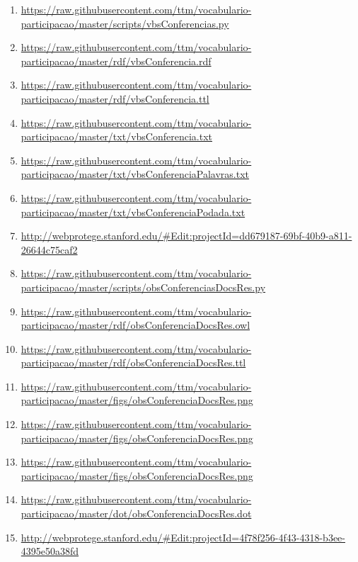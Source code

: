 \documentclass[12pt]{article}
\begin{document}
{\begin{enumerate}
    \item \url{https://raw.githubusercontent.com/ttm/vocabulario-participacao/master/scripts/vbsConferencias.py}\label{i:12}
    \item \url{https://raw.githubusercontent.com/ttm/vocabulario-participacao/master/rdf/vbsConferencia.rdf}\label{i:13}
    \item \url{https://raw.githubusercontent.com/ttm/vocabulario-participacao/master/rdf/vbsConferencia.ttl}\label{i:14}
    \item \url{https://raw.githubusercontent.com/ttm/vocabulario-participacao/master/txt/vbsConferencia.txt}\label{i:16}
    \item \url{https://raw.githubusercontent.com/ttm/vocabulario-participacao/master/txt/vbsConferenciaPalavras.txt}\label{i:17}
    \item \url{https://raw.githubusercontent.com/ttm/vocabulario-participacao/master/txt/vbsConferenciaPodada.txt}\label{i:18}
    \item \url{http://webprotege.stanford.edu/#Edit:projectId=dd679187-69bf-40b9-a811-26644c75caf2}\label{i:18wp}

 \item \url{https://raw.githubusercontent.com/ttm/vocabulario-participacao/master/scripts/obsConferenciasDocsRes.py}    \label{i:6a}
     \item \url{https://raw.githubusercontent.com/ttm/vocabulario-participacao/master/rdf/obsConferenciaDocsRes.owl}    \label{i:7a}
     \item \url{https://raw.githubusercontent.com/ttm/vocabulario-participacao/master/rdf/obsConferenciaDocsRes.ttl}    \label{i:8a}
    \item \url{https://raw.githubusercontent.com/ttm/vocabulario-participacao/master/figs/obsConferenciaDocsRes.png}    \label{i:9a}
    \item \url{https://raw.githubusercontent.com/ttm/vocabulario-participacao/master/figs/obsConferenciaDocsRes.png}   \label{i:10a}
    \item \url{https://raw.githubusercontent.com/ttm/vocabulario-participacao/master/figs/obsConferenciaDocsRes.png}   \label{i:11a}
     \item \url{https://raw.githubusercontent.com/ttm/vocabulario-participacao/master/dot/obsConferenciaDocsRes.dot} \label{i:11_1a}
     \item \url{http://webprotege.stanford.edu/#Edit:projectId=4f78f256-4f43-4318-b3ee-4395e50a38fd} \label{i:11awp}


\end{enumerate}}
\end{document}
